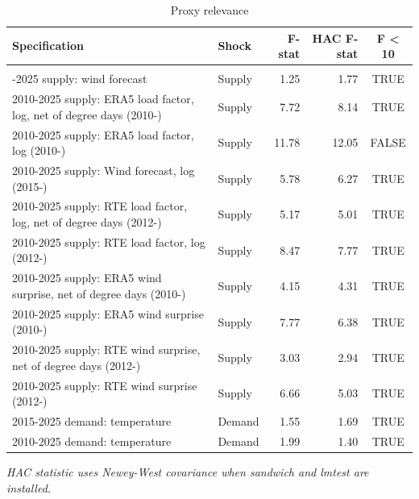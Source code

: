 \begin{table}[t]
\caption*{
{\fontsize{20}{25}\selectfont  Proxy relevance\fontsize{12}{15}\selectfont }
} 
\fontsize{12.0pt}{14.0pt}\selectfont
\begin{tabular*}{\linewidth}{@{\extracolsep{\fill}}llrrc}
\toprule
Specification & Shock & F-stat & HAC F-stat & F < 10 \\ 
\midrule\addlinespace[2.5pt]
\multicolumn{5}{l}{France} \\[2.5pt] 
\midrule\addlinespace[2.5pt]
2015-2025 supply: wind forecast & Supply & 1.25 & 1.77 & TRUE \\ 
2010-2025 supply: ERA5 load factor, log, net of degree days (2010-) & Supply & 7.72 & 8.14 & TRUE \\ 
2010-2025 supply: ERA5 load factor, log (2010-) & Supply & 11.78 & 12.05 & FALSE \\ 
2010-2025 supply: Wind forecast, log (2015-) & Supply & 5.78 & 6.27 & TRUE \\ 
2010-2025 supply: RTE load factor, log, net of degree days (2012-) & Supply & 5.17 & 5.01 & TRUE \\ 
2010-2025 supply: RTE load factor, log (2012-) & Supply & 8.47 & 7.77 & TRUE \\ 
2010-2025 supply: ERA5 wind surprise, net of degree days (2010-) & Supply & 4.15 & 4.31 & TRUE \\ 
2010-2025 supply: ERA5 wind surprise (2010-) & Supply & 7.77 & 6.38 & TRUE \\ 
2010-2025 supply: RTE wind surprise, net of degree days (2012-) & Supply & 3.03 & 2.94 & TRUE \\ 
2010-2025 supply: RTE wind surprise (2012-) & Supply & 6.66 & 5.03 & TRUE \\ 
2015-2025 demand: temperature & Demand & 1.55 & 1.69 & TRUE \\ 
2010-2025 demand: temperature & Demand & 1.99 & 1.40 & TRUE \\ 
\bottomrule
\end{tabular*}
\begin{minipage}{\linewidth}
\vspace{.05em}
\emph{HAC statistic uses Newey-West covariance when sandwich and lmtest are installed.}\\
\end{minipage}
\end{table}

